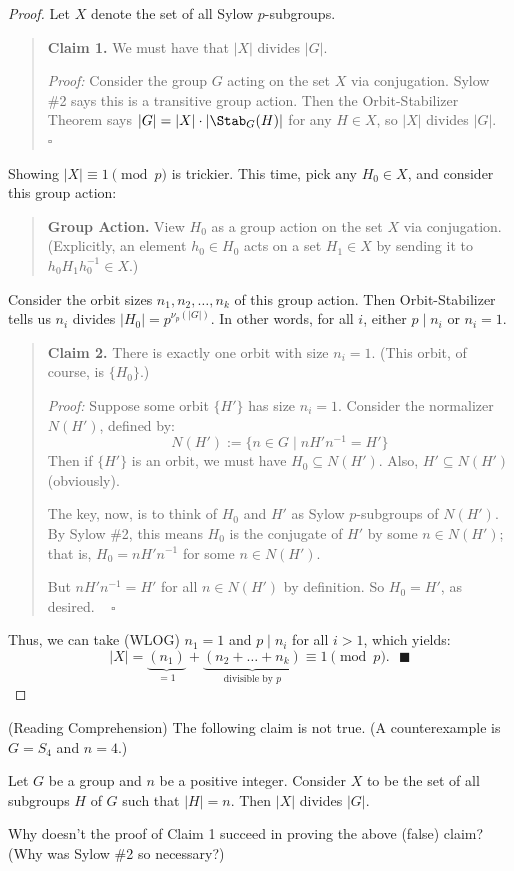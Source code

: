 \begin{proof}
    Let $X$ denote the set of all Sylow $p$-subgroups.
    \begin{quote}
        \textbf{Claim 1.} We must have that $|X|$ divides $|G|$.

        \emph{Proof:} Consider the group $G$ acting on the set $X$ via conjugation.  Sylow \#2 says this is a transitive group action.  Then the Orbit-Stabilizer Theorem says $|G| = |X| \cdot |\Stab_G(H)|$ for any $H \in X$, so $|X|$ divides $|G|$. ~ $\square$
    \end{quote}
    Showing $|X| \equiv 1 \pmod{p}$ is trickier.  This time, pick any $H_0 \in X$, and consider this group action:
    \begin{quote}
        \textbf{Group Action.} View $H_0$ as a group action on the set $X$ via conjugation. \\
        (Explicitly, an element $h_0 \in H_0$ acts on a set $H_1 \in X$ by sending it to $h_0H_1h_0^{-1} \in X$.)
    \end{quote}
    Consider the orbit sizes $n_1, n_2, \dots, n_k$ of this group action.  Then Orbit-Stabilizer tells us $n_i$ divides $|H_0| = p^{\nu_p(|G|)}$.  In other words, for all $i$, either $p \mid n_i$ or $n_i = 1$.
    \begin{quote}
        \textbf{Claim 2.} There is exactly one orbit with size $n_i = 1$.  (This orbit, of course, is $\{H_0\}$.)

        \emph{Proof:} Suppose some orbit $\{H'\}$ has size $n_i = 1$.  Consider the normalizer $N(H')$, defined by:
        \[ N(H') := \{n \in G \mid nH'n^{-1} = H'\} \]
        Then if $\{H'\}$ is an orbit, we must have $H_0 \subseteq N(H')$.  Also, $H' \subseteq N(H')$ (obviously).

        The key, now, is to think of $H_0$ and $H'$ as Sylow $p$-subgroups of $N(H')$.  By Sylow \#2, this means $H_0$ is the conjugate of $H'$ by some $n \in N(H')$; that is, $H_0 = nH'n^{-1}$ for some $n \in N(H')$.

        But $nH'n^{-1} = H'$ for all $n \in N(H')$ by definition.  So $H_0 = H'$, as desired. ~ $\square$
    \end{quote}
    Thus, we can take (WLOG) $n_1 = 1$ and $p \mid n_i$ for all $i > 1$, which yields:
    \[ |X| = \underbrace{(n_1)}_{=1} + \underbrace{(n_2 + \dots + n_k)}_{\text{divisible by } p} \equiv 1 \pmod{p}. ~~~ \blacksquare \] \vspace{-0.4cm}
\end{proof}

\begin{remark}
    (Reading Comprehension) The following claim is not true.  (A counterexample is $G = S_4$ and $n = 4$.)
    \begin{center}
        Let $G$ be a group and $n$ be a positive integer.  Consider $X$ to be the set of all \\ subgroups $H$ of $G$ such that $|H| = n$.  Then $|X|$ divides $|G|$.
    \end{center}
    Why doesn't the proof of Claim 1 succeed in proving the above (false) claim?  (Why was Sylow \#2 so necessary?)
\end{remark}

